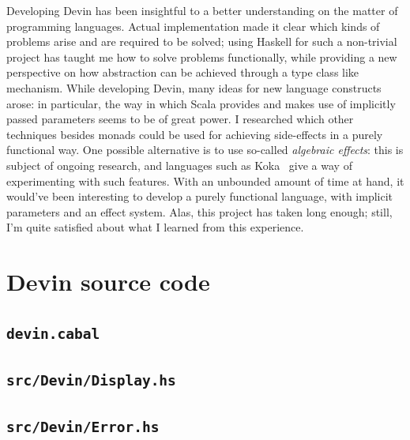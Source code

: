 \documentclass[UdineBachThesis,american,11pt]{PhdThesis}
\begin{document}
  Developing Devin has been insightful to a better understanding on the matter
  of programming languages. Actual implementation made it clear which kinds of
  problems arise and are required to be solved; using Haskell for such a
  non-trivial project has taught me how to solve problems functionally, while
  providing a new perspective on how abstraction can be achieved through a type
  class like mechanism. While developing Devin, many ideas for new language
  constructs arose: in particular, the way in which Scala provides and makes use
  of implicitly passed parameters seems to be of great power. I researched which
  other techniques besides monads could be used for achieving side-effects in a
  purely functional way. One possible alternative is to use so-called
  \emph{algebraic effects}: this is subject of ongoing research, and languages
  such as Koka~\cite{koka} give a way of experimenting with such features. With
  an unbounded amount of time at hand, it would've been interesting to develop a
  purely functional language, with implicit parameters and an effect system.
  Alas, this project has taken long enough; still, I'm quite satisfied about
  what I learned from this experience.

  \backmatter

  \appendix

  \chapter{Devin source code}
  \label{chapter:devin-source-code}

  \section{\texttt{devin.cabal}}

  

  \section{\texttt{src/Devin/Display.hs}}

  

  \section{\texttt{src/Devin/Error.hs}}

  
\end{document}
